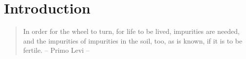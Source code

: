 \graphicspath{{figures/chapter1/}}
\renewcommand\evenpagerightmark{{\scshape\small Introduction}}
\renewcommand\oddpageleftmark{{\scshape\small Chapter 1}}


\hyphenation{}

\chapter[Introduction]%
{Introduction}
\label{ch1}

\begin{flushright}
\begin{quotation}
In order for the wheel to turn, for life to be lived, impurities are needed, and the impurities of impurities in the soil, too, as is known, if it is to be fertile. -- Primo Levi --
\end{quotation}
\end{flushright}
\npar

